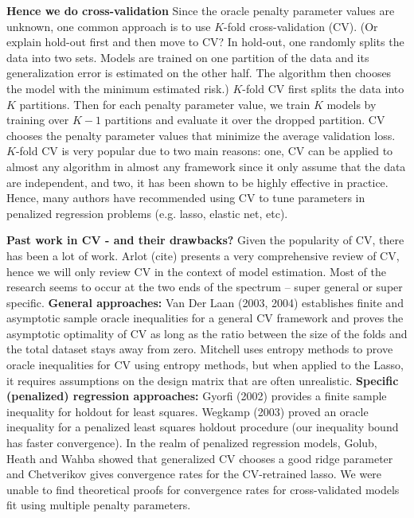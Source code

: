 \documentclass[12pt]{article}
\begin{document}
\textbf{Hence we do cross-validation}
Since the oracle penalty parameter values are unknown, one common approach is to use $K$-fold cross-validation (CV).
(Or explain hold-out first and then move to CV? In hold-out, one randomly splits the data into two sets. Models are trained on one partition of the data and its generalization error is estimated on the other half. The algorithm then chooses the model with the minimum estimated risk.)
$K$-fold CV first splits the data into $K$ partitions. Then for each penalty parameter value, we train $K$ models by training over $K-1$ partitions and evaluate it over the dropped partition. CV chooses the penalty parameter values that minimize the average validation loss. $K$-fold CV is very popular due to two main reasons: one, CV can be applied to almost any algorithm in almost any framework since it only assume that the data are independent, and two, it has been shown to be highly effective in practice. Hence, many authors have recommended using CV to tune parameters in penalized regression problems (e.g. lasso, elastic net, etc).

\textbf{Past work in CV - and their drawbacks?}
Given the popularity of CV, there has been a lot of work. Arlot (cite) presents a very comprehensive review of CV, hence we will only review CV in the context of model estimation. Most of the research seems to occur at the two ends of the spectrum -- super general or super specific. 
\textbf{General approaches:} Van Der Laan (2003, 2004) establishes finite and asymptotic sample oracle inequalities for a general CV framework and proves the asymptotic optimality of CV as long as the ratio between the size of the folds and the total dataset stays away from zero. Mitchell uses entropy methods to prove oracle inequalities for CV using entropy methods, but when applied to the Lasso, it requires assumptions on the design matrix that are often unrealistic.
\textbf{Specific (penalized) regression approaches:} Gyorfi (2002) provides a finite sample inequality for holdout for least squares. Wegkamp (2003) proved an oracle inequality for a penalized least squares holdout procedure (our inequality bound has faster convergence). In the realm of penalized regression models, Golub, Heath and Wahba showed that generalized CV chooses a good ridge parameter and Chetverikov gives convergence rates for the CV-retrained lasso. We were unable to find theoretical proofs for convergence rates for cross-validated models fit using multiple penalty parameters.
\end{document}
